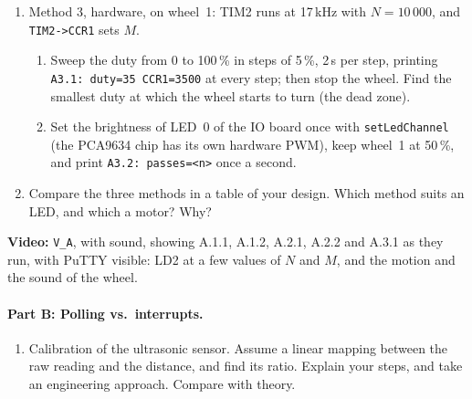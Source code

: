 \documentclass[11pt,a4paper]{article}
\begin{document}
\begin{enumerate}[label=A.\arabic*, leftmargin=2.2em]
\begin{enumerate}[label=A.2.\arabic*, leftmargin=3.2em]
                ARR) it needs. The task runs the PWM of A.2.2 for 2\,s at 10\,kHz, then changes TIM7 to your settings
                with \texttt{\_\_HAL\_TIM\_SET\_PRESCALER} and \texttt{\_\_HAL\_TIM\_SET\_AUTORELOAD}. Compare the
                printed passes per second at the two rates, and explain whether it works. At the new rate the main
                loop may hardly run, so the TIM7 callback itself checks \texttt{task}: when it changes, the callback
                sets TIM7 back to 10\,kHz and stops it.
          \item Time 1000 calls of \texttt{setLedChannel} and print \texttt{A2.4: calls=1000 ms=<time>}. Can method~2
                drive the RGB LEDs from the TIM7 callback? Explain.
        \end{enumerate}
  \item Method 3, hardware, on wheel~1: TIM2 runs at 17\,kHz with $N = 10\,000$, and \texttt{TIM2->CCR1} sets $M$.
        \begin{enumerate}[label=A.3.\arabic*, leftmargin=3.2em]
          \item Sweep the duty from 0 to 100\,\% in steps of 5\,\%, 2\,s per step, printing
                \texttt{A3.1: duty=35 CCR1=3500} at every step; then stop the wheel. Find the smallest duty at which the
                wheel starts to turn (the dead zone).
          \item Set the brightness of LED~0 of the IO board once with \texttt{setLedChannel} (the PCA9634 chip has its
                own hardware PWM), keep wheel~1 at 50\,\%, and print \texttt{A3.2: passes=<n>} once a second.
        \end{enumerate}
  \item Compare the three methods in a table of your design. Which method suits an LED, and which a motor? Why?
\end{enumerate}

\noindent\textbf{Video:} \texttt{V\_A}, with sound, showing A.1.1, A.1.2, A.2.1, A.2.2 and A.3.1 as they run, with
PuTTY visible: LD2 at a few values of $N$ and $M$, and the motion and the sound of the wheel.

\paragraph{Part B: Polling vs.\ interrupts.}
\begin{enumerate}[label=B.\arabic*, leftmargin=2.2em]
  \item Calibration of the ultrasonic sensor. Assume a linear mapping between the raw reading and the distance, and
        find its ratio. Explain your steps, and take an engineering approach. Compare with theory.
\end{enumerate}
\end{document}
